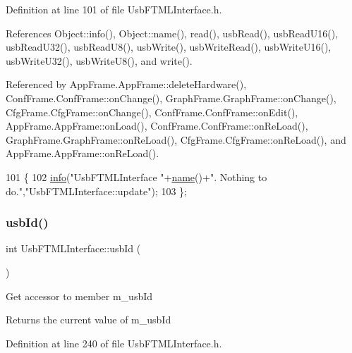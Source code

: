 Definition at line 101 of file Usb\+F\+T\+M\+L\+Interface.\+h.



References Object\+::info(), Object\+::name(), read(), usb\+Read(), usb\+Read\+U16(), usb\+Read\+U32(), usb\+Read\+U8(), usb\+Write(), usb\+Write\+Read(), usb\+Write\+U16(), usb\+Write\+U32(), usb\+Write\+U8(), and write().



Referenced by App\+Frame.\+App\+Frame\+::delete\+Hardware(), Conf\+Frame.\+Conf\+Frame\+::on\+Change(), Graph\+Frame.\+Graph\+Frame\+::on\+Change(), Cfg\+Frame.\+Cfg\+Frame\+::on\+Change(), Conf\+Frame.\+Conf\+Frame\+::on\+Edit(), App\+Frame.\+App\+Frame\+::on\+Load(), Conf\+Frame.\+Conf\+Frame\+::on\+Re\+Load(), Graph\+Frame.\+Graph\+Frame\+::on\+Re\+Load(), Cfg\+Frame.\+Cfg\+Frame\+::on\+Re\+Load(), and App\+Frame.\+App\+Frame\+::on\+Re\+Load().


\begin{DoxyCode}
101                          \{
102     \hyperlink{classObject_a644fd329ea4cb85f54fa6846484b84a8}{info}(\textcolor{stringliteral}{"UsbFTMLInterface "}+\hyperlink{classObject_a300f4c05dd468c7bb8b3c968868443c1}{name}()+\textcolor{stringliteral}{". Nothing to do."},\textcolor{stringliteral}{"UsbFTMLInterface::update"});
103   \};
\end{DoxyCode}
\mbox{\label{classUsbFTMLInterface_a99016c7661780ed89195dc507d3516fc}} 
\subsubsection{\texorpdfstring{usb\+Id()}{usbId()}}
{\footnotesize\ttfamily int Usb\+F\+T\+M\+L\+Interface\+::usb\+Id (\begin{DoxyParamCaption}{ }\end{DoxyParamCaption})\hspace{0.3cm}{\ttfamily [inline]}}

Get accessor to member m\+\_\+usb\+Id \begin{DoxyReturn}{Returns}
the current value of m\+\_\+usb\+Id 
\end{DoxyReturn}


Definition at line 240 of file Usb\+F\+T\+M\+L\+Interface.\+h.



